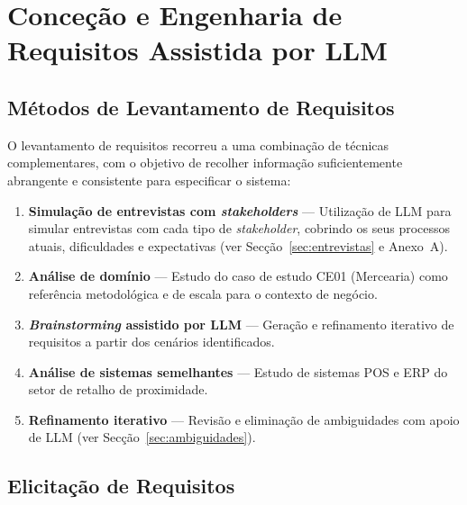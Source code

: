 
\chapter{Conceção e Engenharia de Requisitos Assistida por LLM}

\section{Métodos de Levantamento de Requisitos}

    O levantamento de requisitos recorreu a uma combinação de técnicas complementares, com o objetivo de recolher informação suficientemente abrangente e consistente para especificar o sistema:

\begin{enumerate}
    \item \textbf{Simulação de entrevistas com \textit{stakeholders}} --- Utilização de LLM para simular entrevistas com cada tipo de \textit{stakeholder}, cobrindo os seus processos atuais, dificuldades e expectativas (ver Secção~\ref{sec:entrevistas} e Anexo~A).
    \item \textbf{Análise de domínio} --- Estudo do caso de estudo CE01 (Mercearia) como referência metodológica e de escala para o contexto de negócio.
    \item \textbf{\textit{Brainstorming} assistido por LLM} --- Geração e refinamento iterativo de requisitos a partir dos cenários identificados.
    \item \textbf{Análise de sistemas semelhantes} --- Estudo de sistemas POS e ERP do setor de retalho de proximidade.
    \item \textbf{Refinamento iterativo} --- Revisão e eliminação de ambiguidades com apoio de LLM (ver Secção~\ref{sec:ambiguidades}).
\end{enumerate}

\section{Elicitação de Requisitos}

